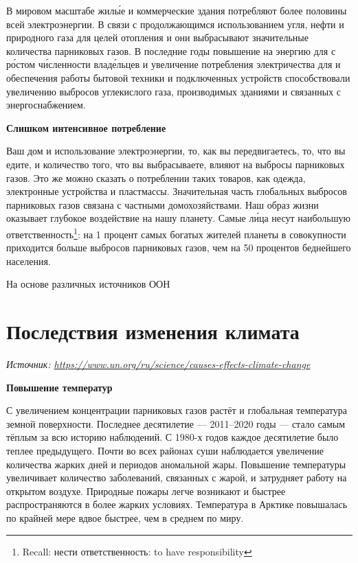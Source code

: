 В мировом масштабе жил\'{ы}е и коммерческие здания потребляют более половины всей электроэнергии. В связи с продолжающимся использованием угля, нефти и природного газа для целей отопления и  они выбрасывают значительные количества парниковых газов. В последние годы повышение  на энергию для  с р\'{о}стом ч\'{и}сленности влад\'{е}льцев  и увеличение потребления электричества для  и обеспечения работы бытовой техники и подключенных устройств способствовали увеличению выбросов углекислого газа, производимых зданиями и связанных с энергоснабжением.

\textbf{Слишком интенсивное потребление}

Ваш дом и использование электроэнергии, то, как вы передвигаетесь, то, что вы едите, и количество того, что вы выбрасываете, влияют на выбросы парниковых газов. Это же можно сказать о потреблении таких товаров, как одежда, электронные устройства и пластмассы. Значительная часть глобальных выбросов парниковых газов связана с частными домохозяйствами. Наш образ жизни оказывает глубокое воздействие на нашу планету. Самые  л\'{и}ца несут наибольшую ответственность\footnote{Recall: нести ответственность: to have responsibility}: на 1 процент самых богатых жителей планеты в совокупности приходится больше выбросов парниковых газов, чем на 50 процентов беднейшего населения.

На основе различных источников ООН

\newpage
\section{Последствия изменения климата}
\textit{Источник: \url{https://www.un.org/ru/science/causes-effects-climate-change}}


\textbf{Повышение температур}

С увеличением концентрации парниковых газов растёт и глобальная температура земной поверхности. Последнее десятилетие --- 2011–2020 годы --- стало самым тёплым за всю историю наблюдений. С 1980-х годов каждое десятилетие было теплее предыдущего. Почти во всех районах суши наблюдается увеличение количества жарких дней и периодов аномальной жары. Повышение температуры увеличивает количество заболеваний, связанных с жарой, и затрудняет работу на открытом воздухе. Природные пожары легче возникают и быстрее распространяются в более жарких условиях. Температура в Арктике повышалась по крайней мере вдвое быстрее, чем в среднем по миру.

